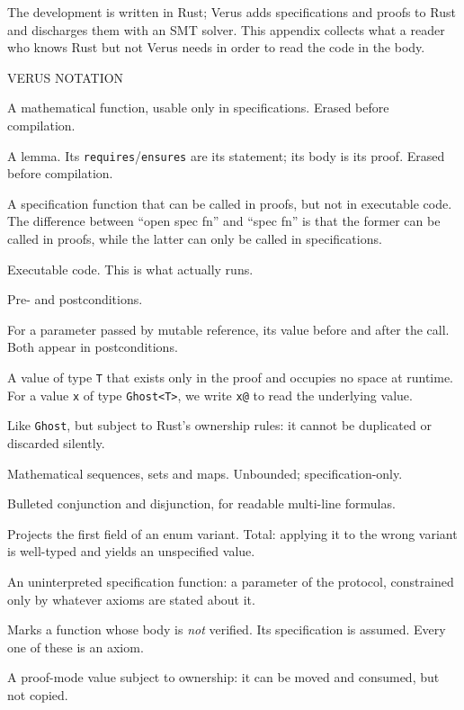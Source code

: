 \documentclass[11pt]{article}
\newcommand{\code}[1]{\texttt{#1}}
\begin{document}
The development is written in Rust; Verus adds specifications and proofs to Rust
and discharges them with an SMT solver. This appendix collects what a reader who
knows Rust but not Verus needs in order to read the code in the body.

\begin{tcolorbox}[colback=sunken,colframe=rulegrey,boxrule=0.4pt,arc=1pt,
                  left=8pt,right=8pt,top=6pt,bottom=6pt,breakable]
{\sffamily\scriptsize\color{neutralmv}\MakeUppercase{Verus notation}}
\par\vspace{5pt}
\begin{description}[leftmargin=!,labelwidth=6.2em,font=\ttfamily\small,
                    itemsep=2pt,parsep=0pt,topsep=2pt]
\item[spec fn] A mathematical function, usable only in specifications. Erased
  before compilation.
\item[proof fn] A lemma. Its \code{requires}/\code{ensures} are its statement;
  its body is its proof. Erased before compilation.
\item[open spec fn] A specification function that can be called in proofs, but not in executable code.
The difference between ``open spec fn'' and ``spec fn'' is that the former can be called in 
proofs, while the latter can only be called in specifications.
\item[fn] Executable code. This is what actually runs.
\item[requires\slash ensures] Pre- and postconditions.
\item[old(x), final(x)] For a parameter passed by mutable reference, its value
  before and after the call. Both appear in postconditions.
\item[Ghost<T>] A value of type \code{T} that exists only in the proof and
  occupies no space at runtime. For a value \code{x} of type \code{Ghost<T>},
we write \code{x@} to read the underlying value.
\item[Tracked<T>] Like \code{Ghost}, but subject to Rust's ownership rules: it
  cannot be duplicated or discarded silently.
\item[Seq, Set, Map] Mathematical sequences, sets and maps. Unbounded;
  specification-only.
\item[\&\&\&, |||] Bulleted conjunction and disjunction, for readable
  multi-line formulas.
\item[x->Variant\_0] Projects the first field of an enum variant. Total:
  applying it to the wrong variant is well-typed and yields an unspecified
  value.
\item[uninterp] An uninterpreted specification function: a parameter of the
  protocol, constrained only by whatever axioms are stated about it.
\item[external\_body] Marks a function whose body is \emph{not} verified. Its
  specification is assumed. Every one of these is an axiom.
\item[tracked x] A proof-mode value subject to ownership: it can be moved and
  consumed, but not copied.
\end{description}
\end{tcolorbox}
\end{document}

